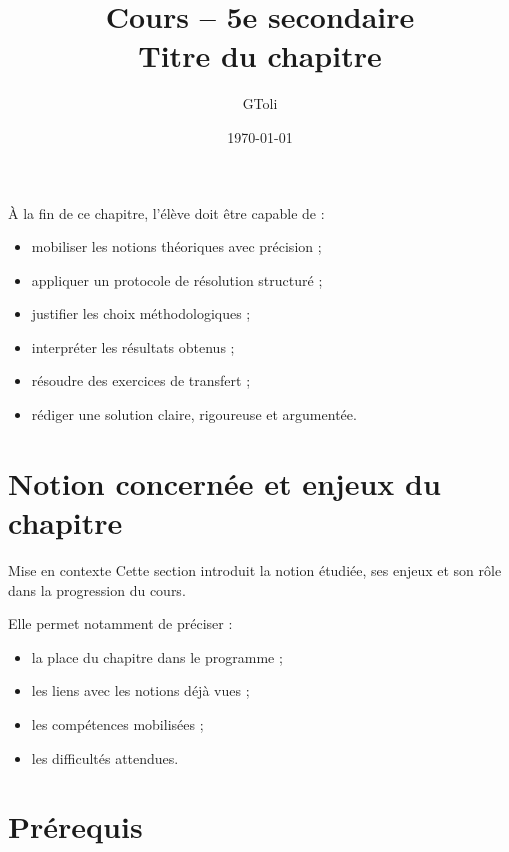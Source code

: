 \documentclass[11pt,a4paper]{article}
\title{\textbf{Cours -- 5e secondaire}\\[0.2cm]
\large Titre du chapitre}
\author{GToli}
\date{\today}
\begin{document}
\maketitle


\begin{cadreobjectif}
À la fin de ce chapitre, l’élève doit être capable de :
\begin{itemize}
    \item mobiliser les notions théoriques avec précision ;
    \item appliquer un protocole de résolution structuré ;
    \item justifier les choix méthodologiques ;
    \item interpréter les résultats obtenus ;
    \item résoudre des exercices de transfert ;
    \item rédiger une solution claire, rigoureuse et argumentée.
\end{itemize}
\end{cadreobjectif}

\section{Notion concernée et enjeux du chapitre}

\begin{cadrebleu}{Mise en contexte}
Cette section introduit la notion étudiée, ses enjeux et son rôle dans la progression du cours.

\medskip

Elle permet notamment de préciser :
\begin{itemize}
    \item la place du chapitre dans le programme ;
    \item les liens avec les notions déjà vues ;
    \item les compétences mobilisées ;
    \item les difficultés attendues.
\end{itemize}
\end{cadrebleu}

\section{Prérequis}
\end{document}
